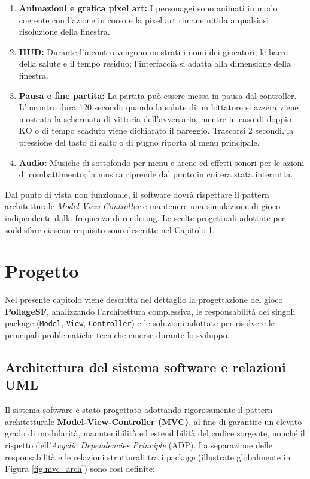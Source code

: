 \documentclass[11pt, a4paper]{article}
\begin{document}
\begin{enumerate}
		\item \textbf{Animazioni e grafica pixel art:} I personaggi sono animati in modo coerente con l'azione in corso e la pixel art rimane nitida a qualsiasi risoluzione della finestra.
		\item \textbf{HUD:} Durante l'incontro vengono mostrati i nomi dei giocatori, le barre della salute e il tempo residuo; l'interfaccia si adatta alla dimensione della finestra.
		\item \textbf{Pausa e fine partita:} La partita può essere messa in pausa dal controller. L'incontro dura 120 secondi: quando la salute di un lottatore si azzera viene mostrata la schermata di vittoria dell'avversario, mentre in caso di doppio KO o di tempo scaduto viene dichiarato il pareggio. Trascorsi 2 secondi, la pressione del tasto di salto o di pugno riporta al menu principale.
		\item \textbf{Audio:} Musiche di sottofondo per menu e arene ed effetti sonori per le azioni di combattimento; la musica riprende dal punto in cui era stata interrotta.
	\end{enumerate}
	
	Dal punto di vista non funzionale, il software dovrà rispettare il pattern architetturale \emph{Model-View-Controller} e mantenere una simulazione di gioco indipendente dalla frequenza di rendering. Le scelte progettuali adottate per soddisfare ciascun requisito sono descritte nel Capitolo \ref{sec:progetto}.
	
	\newpage
	
	\section{Progetto}\label{sec:progetto}
	Nel presente capitolo viene descritta nel dettaglio la progettazione del gioco \textbf{PollageSF}, analizzando l'architettura complessiva, le responsabilità dei singoli package (\texttt{Model}, \texttt{View}, \texttt{Controller}) e le soluzioni adottate per risolvere le principali problematiche tecniche emerse durante lo sviluppo.
	
	\subsection{Architettura del sistema software e relazioni UML}
	Il sistema software è stato progettato adottando rigorosamente il pattern architetturale \textbf{Model-View-Controller (MVC)}, al fine di garantire un elevato grado di modularità, manutenibilità ed estendibilità del codice sorgente, nonché il rispetto dell'\emph{Acyclic Dependencies Principle} (ADP). La separazione delle responsabilità e le relazioni strutturali tra i package (illustrate globalmente in Figura \ref{fig:mvc_arch}) sono così definite:
	
\end{document}
